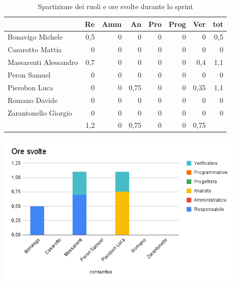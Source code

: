 \begin{table}[ht]
    \begin{tabularx}{\linewidth}{X|rrrrrrr}
    \rowcolor{gray!30}& Re & Amm & An & Pro & Prog & Ver & tot \\
    \hline
    Bonavigo Michele                        & 0,5 & 0 & 0 & 0 & 0 & 0  & 0,5 \\
    \rowcolor{gray!10}Casarotto Mattia      & 0 & 0 & 0 & 0 & 0 & 0 & 0 \\
    Massarenti Alessandro                   & 0,7 & 0 & 0 & 0 & 0 & 0,4  & 1,1 \\
    \rowcolor{gray!10}Peron Samuel          & 0 & 0 & 0 & 0 & 0 & 0 & 0 \\
    Pierobon Luca                           & 0 & 0 & 0,75 & 0 & 0 & 0,35 & 1,1 \\
    \rowcolor{gray!10}Romano Davide         & 0 & 0 & 0 & 0 & 0 & 0 & 0 \\
    Zarantonello Giorgio                    & 0 & 0 & 0 & 0 & 0 & 0 & 0 \\
    \hline                                  & 1,2 & 0 & 0,75 & 0 & 0 & 0,75 & \\
    \end{tabularx}
    \caption{\label{ruoli-persone}Spartizione dei ruoli e ore svolte durante lo sprint}
\end{table}

\begin{center}
\includegraphics[width=12cm]{img/ore-svolte.png}
\end{center}

